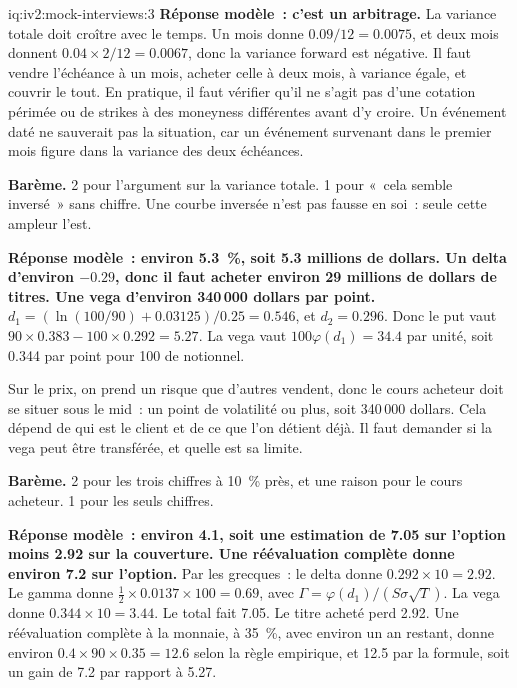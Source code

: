\begin{solution}{iq:iv2:mock-interviews:3}
\ivstop
\textbf{Réponse modèle~: c'est un arbitrage.} La variance totale doit croître avec le temps. Un mois donne $0.09/12 = 0.0075$, et deux mois donnent $0.04 \times 2/12 = 0.0067$, donc la variance forward est négative. Il faut vendre l'échéance à un mois, acheter celle à deux mois, à variance égale, et couvrir le tout. En pratique, il faut vérifier qu'il ne s'agit pas d'une cotation périmée ou de strikes à des moneyness différentes avant d'y croire. Un événement daté ne sauverait pas la situation, car un événement survenant dans le premier mois figure dans la variance des deux échéances.

\textbf{Barème.} 2 pour l'argument sur la variance totale. 1 pour «~cela semble inversé~» sans chiffre. Une courbe inversée n'est pas fausse en soi~: seule cette ampleur l'est.

\ivstop
\textbf{Réponse modèle~: environ 5.3~\%, soit 5.3 millions de dollars. Un delta d'environ $-0.29$, donc il faut acheter environ 29 millions de dollars de titres. Une vega d'environ 340\,000 dollars par point.} $d_1 = (\ln(100/90) + 0.03125)/0.25 = 0.546$, et $d_2 = 0.296$. Donc le put vaut $90 \times 0.383 - 100 \times 0.292 = 5.27$. La vega vaut $100\varphi(d_1) = 34.4$ par unité, soit 0.344 par point pour 100 de notionnel.

Sur le prix, on prend un risque que d'autres vendent, donc le cours acheteur doit se situer sous le mid~: un point de volatilité ou plus, soit 340\,000 dollars. Cela dépend de qui est le client et de ce que l'on détient déjà. Il faut demander si la vega peut être transférée, et quelle est sa limite.

\textbf{Barème.} 2 pour les trois chiffres à 10~\% près, et une raison pour le cours acheteur. 1 pour les seuls chiffres.

\ivstop
\textbf{Réponse modèle~: environ 4.1, soit une estimation de 7.05 sur l'option moins 2.92 sur la couverture. Une réévaluation complète donne environ 7.2 sur l'option.} Par les grecques~: le delta donne $0.292 \times 10 = 2.92$. Le gamma donne $\tfrac12 \times 0.0137 \times 100 = 0.69$, avec $\Gamma = \varphi(d_1)/(S\sigma\sqrt{T})$. La vega donne $0.344 \times 10 = 3.44$. Le total fait 7.05. Le titre acheté perd 2.92. Une réévaluation complète à la monnaie, à 35~\%, avec environ un an restant, donne environ $0.4 \times 90 \times 0.35 = 12.6$ selon la règle empirique, et 12.5 par la formule, soit un gain de 7.2 par rapport à 5.27.


\end{solution}
